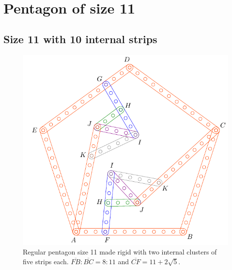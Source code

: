 \documentclass[11pt]{article}
\begin{document}
\section{Pentagon of size 11}

\subsection{Size 11 with 10 internal strips}

\begin{figure}[h]
 \centering
 \includegraphics[scale=0.85]{11/penta11a}
 \caption{Regular pentagon size 11 made rigid with two internal clusters of five strips each. $\overline{FB}:\overline{BC} = 8:11$ and $\overline{CF} = 11 + 2\sqrt5$.}
 \label{fig:penta11a}
\end{figure}
\end{document}
